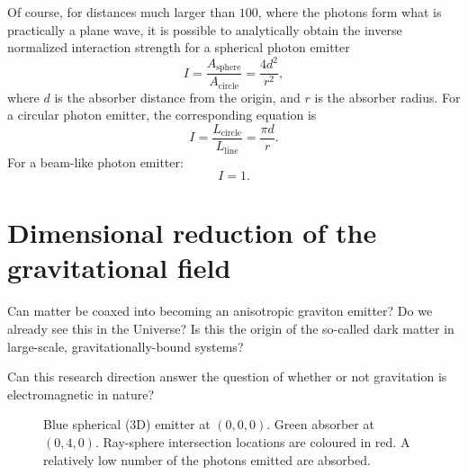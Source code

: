 \documentclass[12pt]{article}
\begin{document}
Of course, for distances much larger than $100$, where the photons form what is practically a plane wave, it is possible to analytically obtain the inverse normalized interaction strength for a spherical photon emitter
\begin{equation}
I = \frac{ A_{{\textrm{sphere}}} }{ A_{{\textrm{circle}}} } = \frac{4 d^2}{r^2},
\end{equation}
where $d$ is the absorber distance from the origin, and $r$ is the absorber radius.
For a circular photon emitter, the corresponding equation is
\begin{equation}
I =  \frac{ L_{{\textrm{circle}}} }{ L_{{\textrm{line}}} }  =  \frac{\pi d}{r}.
\end{equation}
For a beam-like photon emitter:
\begin{equation}
I = 1.
\end{equation}

\section{Dimensional reduction of the gravitational field}

Can matter be coaxed into becoming an anisotropic graviton emitter?
Do we already see this in the Universe?
Is this the origin of the so-called dark matter in large-scale, gravitationally-bound systems?

Can this research direction answer the question of whether or not gravitation is electromagnetic in nature?





\pagebreak





\begin{figure} 
\centering
{}
  \caption{
Blue spherical (3D) emitter at $(0, 0, 0)$. 
Green absorber at $(0, 4, 0)$. 
Ray-sphere intersection locations are coloured in red.
A relatively low number of the photons emitted are absorbed.
}
\end{figure}
\end{document}
